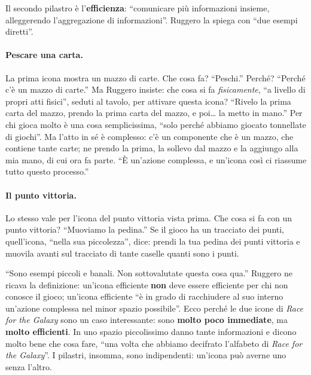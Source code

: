 

Il secondo pilastro è l'\textbf{efficienza}: ``comunicare più informazioni insieme,
alleggerendo l'aggregazione di informazioni''. Ruggero la spiega con ``due esempi
diretti''.

\paragraph{Pescare una carta.} La prima icona mostra un mazzo di carte. Che cosa fa?
``Peschi.'' Perché? ``Perché c'è un mazzo di carte.'' Ma Ruggero insiste: che cosa si fa
\emph{fisicamente}, ``a livello di propri atti fisici'', seduti al tavolo, per attivare
questa icona? ``Rivelo la prima carta del mazzo, prendo la prima carta del mazzo, e
poi\dots{} la metto in mano.'' Per chi gioca molto è una cosa semplicissima, ``solo
perché abbiamo giocato tonnellate di giochi''. Ma l'atto in sé è complesso: c'è un
componente che è un mazzo, che contiene tante carte; ne prendo la prima, la sollevo dal
mazzo e la aggiungo alla mia mano, di cui ora fa parte. ``È un'azione complessa, e
un'icona così ci riassume tutto questo processo.''

\paragraph{Il punto vittoria.} Lo stesso vale per l'icona del punto vittoria vista
prima. Che cosa si fa con un punto vittoria? ``Muoviamo la pedina.'' Se il gioco ha un
tracciato dei punti, quell'icona, ``nella sua piccolezza'', dice: prendi la tua pedina
dei punti vittoria e muovila avanti sul tracciato di tante caselle quanti sono i punti.

``Sono esempi piccoli e banali. Non sottovalutate questa cosa qua.'' Ruggero ne ricava
la definizione: un'icona efficiente \textbf{non} deve essere efficiente per chi non
conosce il gioco; un'icona efficiente ``è in grado di racchiudere al suo interno
un'azione complessa nel minor spazio possibile''. Ecco perché le due icone di \emph{Race
for the Galaxy} sono un caso interessante: sono \textbf{molto poco immediate}, ma
\textbf{molto efficienti}. In uno spazio piccolissimo danno tante informazioni e dicono
molto bene che cosa fare, ``una volta che abbiamo decifrato l'alfabeto di \emph{Race for
the Galaxy}''. I pilastri, insomma, sono indipendenti: un'icona può averne uno senza
l'altro.

